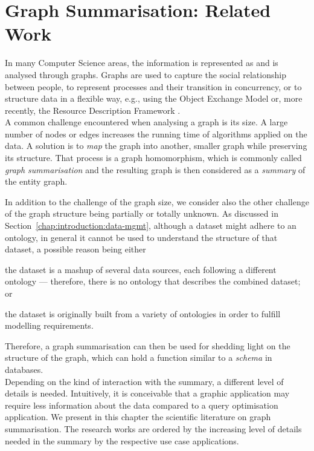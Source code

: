 \chapter{Graph Summarisation: Related Work}
\label{chap3:review}

In many Computer Science areas, the information is represented as and is analysed through graphs. Graphs are used to capture the social relationship between people, to represent processes and their transition in concurrency, or to structure data in a flexible way, e.g., using the Object Exchange Model \cite{papakonstantinou:1995:oea} or, more recently, the Resource Description Framework \cite{rdfconcepts}.\\

A common challenge encountered when analysing a graph is its size. A large number of nodes or edges increases the running time of algorithms applied on the data. A solution is to \emph{map} the graph into another, smaller graph while preserving its structure. That process is a graph homomorphism, which is commonly called \emph{graph summarisation} and the resulting graph is then considered as a \emph{summary} of the entity graph.

In addition to the challenge of the graph size, we consider also the other challenge of the graph structure being partially or totally unknown. As discussed in Section~\ref{chap:introduction:data-mgmt}, although a dataset might adhere to an ontology, in general it cannot be used to understand the structure of that dataset, a possible reason being either
\begin{inparaenum}[(a)]
\item the dataset is a mashup of several data sources, each following a different ontology --- therefore, there is no ontology that describes the combined dataset; or
\item the dataset is originally built from a variety of ontologies in order to fulfill modelling requirements.
\end{inparaenum}
Therefore, a graph summarisation can then be used for shedding light on the structure of the graph, which can hold a function similar to a \emph{schema} in databases.\\

Depending on the kind of interaction with the summary, a different level of details is needed. Intuitively, it is conceivable that a graphic application may require less information about the data compared to a query optimisation application. We present in this chapter the scientific literature on graph summarisation. The research works are ordered by the increasing level of details needed in the summary by the respective use case applications.

